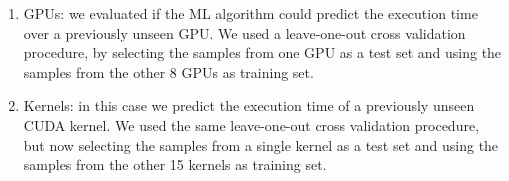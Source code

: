 \begin{enumerate}
\item GPUs: we evaluated if the ML algorithm could predict the execution time over a previously unseen GPU. We used a leave-one-out cross validation procedure, by selecting the samples from one GPU as a test set and using the samples from the other 8 GPUs as training set.

\item Kernels: in this case we predict the execution time of a previously unseen CUDA kernel. We used the same leave-one-out cross validation procedure, but now selecting the samples from a single kernel as a test set and using the samples from the other 15 kernels as training set.
\end{enumerate}

